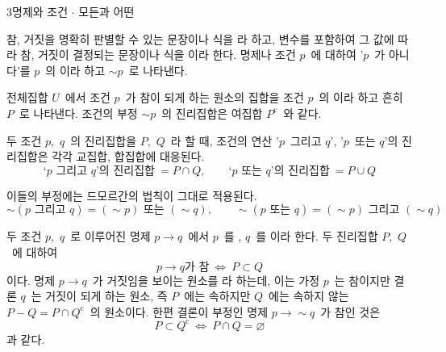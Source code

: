 \documentclass[10pt]{article}
\begin{document}
\newpage

\dmconcepthead
{}

\begin{dmconcept}{3}{명제와 조건 $\cdot$ 모든과 어떤}
\setlength{\parskip}{0.6mm plus 0.7mm minus 0mm}\linespread{1.10}\selectfont%


참, 거짓을 명확히 판별할 수 있는 문장이나 식을 라 하고, 변수를 포함하여 그 값에 따라 참, 거짓이 결정되는 문장이나 식을 이라 한다. 명제나 조건 $p$\ 에 대하여 '$p$\ 가 아니다'를 $p$\ 의 이라 하고 $\sim p$\ 로 나타낸다.

전체집합 $U$\ 에서 조건 $p$\ 가 참이 되게 하는 원소의 집합을 조건 $p$\ 의 이라 하고 흔히 $P$\ 로 나타낸다. 조건의 부정 $\sim p$\ 의 진리집합은 여집합 $P^\mathrm{c}$\ 와 같다.


두 조건 $p$,\ $q$\ 의 진리집합을 $P$,\ $Q$\ 라 할 때, 조건의 연산 '$p$\ 그리고 $q$', '$p$\ 또는 $q$'의 진리집합은 각각 교집합, 합집합에 대응된다.
\begin{equation*}
  \text{`$p$\ 그리고 $q$'의 진리집합}\ = P \cap Q, \qquad \text{`$p$\ 또는 $q$'의 진리집합}\ = P \cup Q
\end{equation*}

이들의 부정에는 드모르간의 법칙이 그대로 적용된다.
\begin{equation*}
  \sim (p \text{ 그리고 } q) = (\sim p) \text{ 또는 } (\sim q), \qquad \sim (p \text{ 또는 } q) = (\sim p) \text{ 그리고 } (\sim q)
\end{equation*}


두 조건 $p$,\ $q$\ 로 이루어진 명제 $p \to q$\ 에서 $p$\ 를 , $q$\ 를 이라 한다. 두 진리집합 $P$,\ $Q$\ 에 대하여
\begin{equation*}
  p \to q \text{가 참} \ \Longleftrightarrow\ P \subset Q
\end{equation*}
이다. 명제 $p \to q$\ 가 거짓임을 보이는 원소를 라 하는데, 이는 가정 $p$\ 는 참이지만 결론 $q$\ 는 거짓이 되게 하는 원소, 즉 $P$\ 에는 속하지만 $Q$\ 에는 속하지 않는 $P - Q = P \cap Q^\mathrm{c}$\ 의 원소이다. 한편 결론이 부정인 명제 $p \to \sim q$\ 가 참인 것은
\begin{equation*}
  P \subset Q^\mathrm{c}\ \Longleftrightarrow\ P \cap Q = \varnothing
\end{equation*}
과 같다.


\end{dmconcept}
\end{document}
